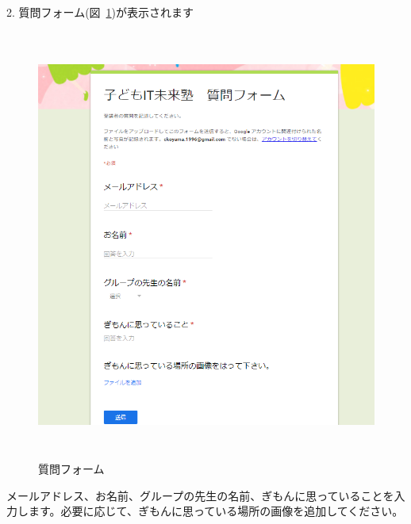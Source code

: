 2.
質問フォーム(図~\ref{fig:question_form})が表示されます

\begin{figure}[H]
  
    \begin{center}
      
      \includegraphics[width=13.263cm,height=14.233cm]{text04-img/textbook-img246.png}
      \caption{\label{fig:question_form}質問フォーム}
    \end{center}
    
\end{figure}

メールアドレス、お名前、グループの先生の名前、ぎもんに思っていることを入力します。必要に応じて、ぎもんに思っている場所の画像を追加してください。

\begin{description}
    \item {}
\end{description}


